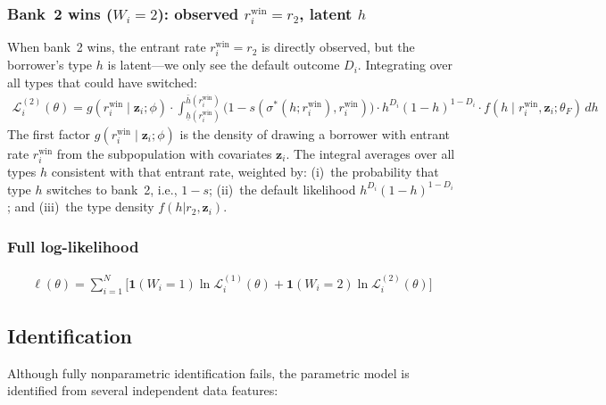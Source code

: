 \documentclass[12pt]{article}
\theoremstyle{plain}
\theoremstyle{plain}
\theoremstyle{definition}  %
\theoremstyle{remark}  %
\begin{document}
\subsubsection{Bank~2 wins ($W_i = 2$): observed $r_i^{\text{win}} = r_2$, latent $h$}

When bank~2 wins, the entrant rate $r_i^{\text{win}} = r_2$ is directly observed, but the borrower's type $h$ is latent---we only see the default outcome $D_i$. Integrating over all types that could have switched:
\begin{align}\label{eq:L2}
    \boxed{\mathcal{L}_i^{(2)}(\theta) = g(r_i^{\text{win}} \mid \mathbf{z}_i;\phi) \cdot \int_{\underline{h}(r_i^{\text{win}})}^{\bar{h}(r_i^{\text{win}})} \big(1-s(\sigma^*(h;r_i^{\text{win}}), r_i^{\text{win}})\big) \cdot h^{D_i}(1-h)^{1-D_i} \cdot f(h \mid r_i^{\text{win}}, \mathbf{z}_i;\theta_F)\, dh}
\end{align}
The first factor $g(r_i^{\text{win}} \mid \mathbf{z}_i;\phi)$ is the density of drawing a borrower with entrant rate $r_i^{\text{win}}$ from the subpopulation with covariates $\mathbf{z}_i$. The integral averages over all types $h$ consistent with that entrant rate, weighted by: (i)~the probability that type $h$ switches to bank~2, i.e., $1-s$; (ii)~the default likelihood $h^{D_i}(1-h)^{1-D_i}$; and (iii)~the type density $f(h|r_2, \mathbf{z}_i)$.

\subsubsection{Full log-likelihood}

\begin{align}\label{eq:L_full}
    \ell(\theta) = \sum_{i=1}^N \Big[\mathbf{1}(W_i=1)\ln \mathcal{L}_i^{(1)}(\theta) + \mathbf{1}(W_i=2)\ln \mathcal{L}_i^{(2)}(\theta)\Big]
\end{align}

\subsection{Identification}\label{sec:identification}

Although fully nonparametric identification fails, the parametric model is identified from several independent data features:
\end{document}

